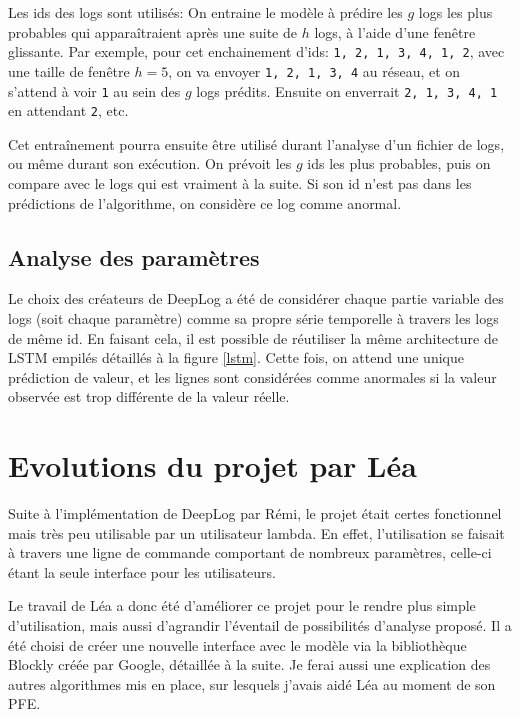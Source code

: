 \documentclass[openany, 11pt]{memoir}
\begin{document}
Les ids des \glspl{log} sont utilisés: On entraine le modèle à prédire les $g$ logs les plus probables qui apparaîtraient après une suite de $h$ logs, à l'aide d'une fenêtre glissante. Par exemple, pour cet enchainement d'ids: \texttt{1, 2, 1, 3, 4, 1, 2}, avec une taille de fenêtre $h=5$, on va envoyer \texttt{1, 2, 1, 3, 4} au réseau, et on s'attend à voir \texttt{1} au sein des $g$ logs prédits. Ensuite on enverrait \texttt{2, 1, 3, 4, 1} en attendant \texttt{2}, etc.

\bigskip
Cet entraînement pourra ensuite être utilisé durant l'analyse d'un fichier de \glspl{log}, ou même durant son exécution. On prévoit les $g$ ids les plus probables, puis on compare avec le logs qui est vraiment à la suite. Si son id n'est pas dans les prédictions de l'algorithme, on considère ce log comme anormal.

\subsection{Analyse des paramètres}

Le choix des créateurs de DeepLog a été de considérer chaque partie variable des \glspl{log} (soit chaque paramètre) comme sa propre série temporelle à travers les logs de même id. En faisant cela, il est possible de réutiliser la même architecture de \gls{LSTM} empilés détaillés à la figure \ref{lstm}. Cette fois, on attend une unique prédiction de valeur, et les lignes sont considérées comme anormales si la valeur observée est trop différente de la valeur réelle.

\newpage
\section{Evolutions du projet par Léa}

Suite à l'implémentation de DeepLog par Rémi, le projet était certes fonctionnel mais très peu utilisable par un utilisateur lambda. En effet, l'utilisation se faisait à travers une ligne de commande comportant de nombreux paramètres, celle-ci étant la seule interface pour les utilisateurs.

Le travail de Léa a donc été d'améliorer ce projet pour le rendre plus simple d'utilisation, mais aussi d'agrandir l'éventail de possibilités d'analyse proposé. Il a été choisi de créer une nouvelle interface avec le modèle via la bibliothèque Blockly créée par Google, détaillée à la suite. Je ferai aussi une explication des autres algorithmes mis en place, sur lesquels j'avais aidé Léa au moment de son PFE.
\end{document}
